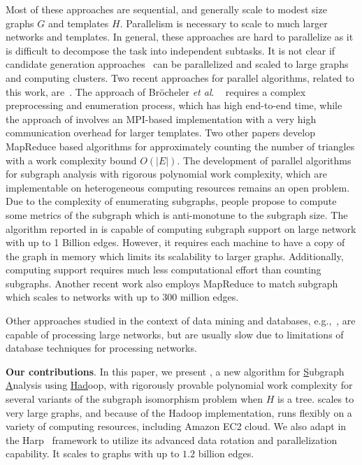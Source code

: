 Most of these approaches are
sequential, and generally  scale to modest size graphs $G$  and templates $H$.
Parallelism is necessary to scale to much larger networks and templates.
In general, these approaches are  hard to parallelize as it is 
difficult to decompose the task into independent subtasks. It is not clear if
candidate generation approaches~\cite{kuramochi2005finding, huan2004spin,
yan2005mining} can be parallelized and scaled to large graphs and computing
clusters. Two recent approaches for parallel algorithms, related to this work,
are~\cite{brocheler2010cosi, zhao2010subgraph}. The approach of Br\"{o}cheler
\emph{et al}. ~\cite{brocheler2010cosi} requires a complex preprocessing and
enumeration process, which has high end-to-end time, while the approach of
\cite{zhao2010subgraph} involves an MPI-based implementation with a very high
communication overhead for larger templates.  Two other papers
\cite{suri2011counting, pagh2011colorful} develop MapReduce based algorithms for
approximately counting the number of triangles with a work complexity bound
$O(|E|)$. The development of  parallel algorithms for
subgraph analysis with rigorous polynomial work complexity, which are
implementable on heterogeneous computing resources remains an open problem.
Due to the complexity of
enumerating subgraphs, people propose to compute some metrics of the subgraph
which is anti-monotune to the subgraph size. The algorithm  reported in
\cite{abdelhamid2016scalemine} is capable of computing subgraph support on
 large network with up to 1 Billion edges. However, it requires each
machine to have a copy of the graph in memory which limits its scalability to larger graphs.
Additionally, computing support requires much less computational effort
than counting subgraphs. Another recent work also employs MapReduce to match
subgraph~\cite{suo2016towards} which scales to networks with up to 300 million
edges. 

Other approaches studied in the context of data mining and databases,
e.g.,~\cite{sakr2009graphrel, ronen2009evaluating, brocheler2010cosi},
are capable of processing large networks, but are usually slow due to
limitations of database techniques for processing networks.

\noindent
\textbf{Our contributions}.
In this paper, we present \sahad{}, a new algorithm for
\underline{S}ubgraph \underline{A}nalysis using \underline{Had}oop, with
rigorously provable polynomial work complexity for several variants of the subgraph
isomorphism problem when $H$ is a tree.
\sahad{} scales to very large graphs, and because of the Hadoop
implementation, runs flexibly on a variety of computing resources, including
Amazon EC2 cloud. We also adapt \sahad{} in the Harp~\cite{qiu2014towards}
framework to utilize its advanced data rotation and parallelization capability.
It scales to graphs with up to $1.2$ billion edges. 

